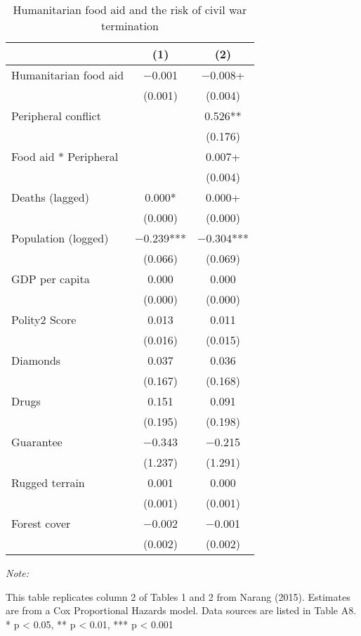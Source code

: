 \begin{table}
\centering\centering
\caption{Humanitarian food aid and the risk of civil war termination \label{a\_duration}}
\centering
\fontsize{8}{10}\selectfont
\begin{threeparttable}
\begin{tabular}[t]{lcc}
\toprule
  & (1) & (2)\\
\midrule
Humanitarian food aid & \num{-0.001} & \num{-0.008}+\\
 & (\num{0.001}) & (\num{0.004})\\
Peripheral conflict &  & \num{0.526}**\\
 &  & (\num{0.176})\\
Food aid * Peripheral &  & \num{0.007}+\\
 &  & (\num{0.004})\\
Deaths (lagged) & \num{0.000}* & \num{0.000}+\\
 & (\num{0.000}) & (\num{0.000})\\
Population (logged) & \num{-0.239}*** & \num{-0.304}***\\
 & (\num{0.066}) & (\num{0.069})\\
GDP per capita & \num{0.000} & \num{0.000}\\
 & (\num{0.000}) & (\num{0.000})\\
Polity2 Score & \num{0.013} & \num{0.011}\\
 & (\num{0.016}) & (\num{0.015})\\
Diamonds & \num{0.037} & \num{0.036}\\
 & (\num{0.167}) & (\num{0.168})\\
Drugs & \num{0.151} & \num{0.091}\\
 & (\num{0.195}) & (\num{0.198})\\
Guarantee & \num{-0.343} & \num{-0.215}\\
 & (\num{1.237}) & (\num{1.291})\\
Rugged terrain & \num{0.001} & \num{0.000}\\
 & (\num{0.001}) & (\num{0.001})\\
Forest cover & \num{-0.002} & \num{-0.001}\\
 & (\num{0.002}) & (\num{0.002})\\
\bottomrule
\end{tabular}
\begin{tablenotes}[para]
\item \textit{Note: } 
\item This table replicates column 2 of Tables 1 and 2 from Narang (2015). Estimates are from a Cox Proportional Hazards model. Data sources are listed in Table A8. * p < 0.05, ** p < 0.01, *** p < 0.001
\end{tablenotes}
\end{threeparttable}
\end{table}
